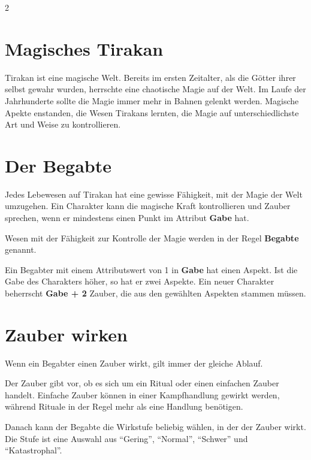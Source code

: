 \label{ch:magie}

\begin{multicols*}{2}

\section{Magisches Tirakan}\label{sec:magisches-tirakan}

Tirakan ist eine magische Welt.
Bereits im ersten Zeitalter, als die Götter ihrer selbst gewahr wurden, herrschte eine chaotische Magie auf der Welt.
Im Laufe der Jahrhunderte sollte die Magie immer mehr in Bahnen gelenkt werden. Magische Apekte enstanden, die Wesen Tirakans lernten, die Magie auf unterschiedlichste Art und Weise zu kontrollieren.

\section{Der Begabte}\label{sec:der-begabte}

Jedes Lebewesen auf Tirakan hat eine gewisse Fähigkeit, mit der Magie der Welt umzugehen.
Ein Charakter kann die magische Kraft kontrollieren und Zauber sprechen, wenn er mindestens einen Punkt im Attribut \textbf{Gabe} hat.

Wesen mit der Fähigkeit zur Kontrolle der Magie werden in der Regel \textbf{Begabte} genannt.

Ein Begabter mit einem Attributswert von 1 in \textbf{Gabe} hat einen Aspekt. Ist die Gabe des Charakters höher, so hat er zwei Aspekte. Ein neuer Charakter beherrscht \textbf{Gabe + 2} Zauber, die aus den gewählten Aspekten stammen müssen.

\section{Zauber wirken}\label{sec:zauber-wirken}

Wenn ein Begabter einen Zauber wirkt, gilt immer der gleiche Ablauf.

Der Zauber gibt vor, ob es sich um ein Ritual oder einen einfachen Zauber handelt.
Einfache Zauber können in einer Kampfhandlung gewirkt werden, während Rituale in der Regel mehr als eine Handlung benötigen.

Danach kann der Begabte die Wirkstufe beliebig wählen, in der der Zauber wirkt.
Die Stufe ist eine Auswahl aus ``Gering'', ``Normal'', ``Schwer'' und ``Katastrophal''.


\end{multicols*}
